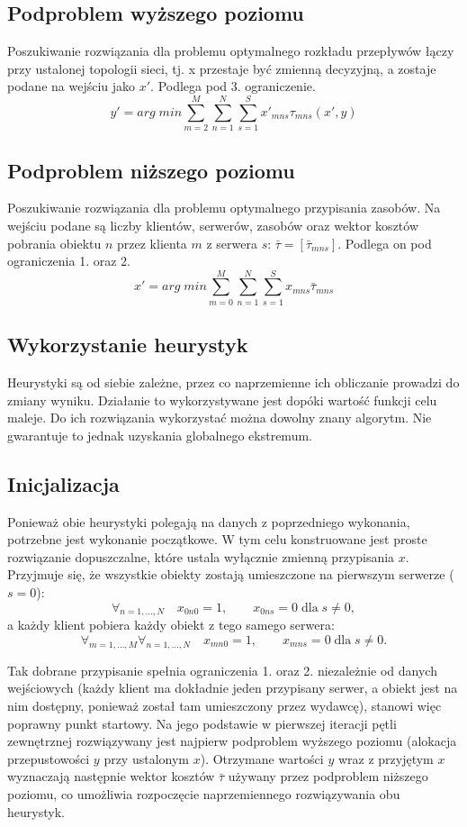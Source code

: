 \documentclass{article}
\begin{document}
\subsection{Podproblem wyższego poziomu}
Poszukiwanie rozwiązania dla problemu optymalnego rozkładu przepływów łączy przy ustalonej topologii sieci, tj. x przestaje być zmienną decyzyjną, a zostaje podane na wejściu jako $x'$. Podlega pod 3. ograniczenie.
\[y'=arg\;min\sum^M_{m=2}\sum^N_{n=1}\sum^S_{s=1}x'_{mns}\tau_{mns}(x',y)\]

\subsection{Podproblem niższego poziomu}
Poszukiwanie rozwiązania dla problemu optymalnego przypisania zasobów. Na wejściu podane są liczby klientów, serwerów, zasobów oraz wektor kosztów pobrania obiektu $n$ przez klienta $m$ z serwera $s$: $\bar{\tau}=[\bar{\tau}_{mns}]$. Podlega on pod ograniczenia 1. oraz 2.
\[x'=arg\;min\sum^M_{m=0}\sum^N_{n=1}\sum^S_{s=1}x_{mns}\bar{\tau}_{mns}\]

\subsection{Wykorzystanie heurystyk}
Heurystyki są od siebie zależne, przez co naprzemienne ich obliczanie prowadzi do zmiany wyniku. Działanie to wykorzystywane jest dopóki wartość funkcji celu maleje. Do ich rozwiązania wykorzystać można dowolny znany algorytm. Nie gwarantuje to jednak uzyskania globalnego ekstremum.

\subsection{Inicjalizacja}
Ponieważ obie heurystyki polegają na danych z poprzedniego wykonania, potrzebne jest wykonanie początkowe. W tym celu konstruowane jest proste rozwiązanie dopuszczalne, które ustala wyłącznie zmienną przypisania $x$. Przyjmuje się, że wszystkie obiekty zostają umieszczone na pierwszym serwerze ($s=0$):
\[\forall_{n=1,...,N}\quad x_{0n0}=1,\qquad x_{0ns}=0\;\text{dla}\;s\neq 0,\]
a każdy klient pobiera każdy obiekt z tego samego serwera:
\[\forall_{m=1,...,M}\forall_{n=1,...,N}\quad x_{mn0}=1,\qquad x_{mns}=0\;\text{dla}\;s\neq 0.\]

Tak dobrane przypisanie spełnia ograniczenia 1. oraz 2. niezależnie od danych wejściowych (każdy klient ma dokładnie jeden przypisany serwer, a obiekt jest na nim dostępny, ponieważ został tam umieszczony przez wydawcę), stanowi więc poprawny punkt startowy. Na jego podstawie w pierwszej iteracji pętli zewnętrznej rozwiązywany jest najpierw podproblem wyższego poziomu (alokacja przepustowości $y$ przy ustalonym $x$). Otrzymane wartości $y$ wraz z przyjętym $x$ wyznaczają następnie wektor kosztów $\bar{\tau}$ używany przez podproblem niższego poziomu, co umożliwia rozpoczęcie naprzemiennego rozwiązywania obu heurystyk.
\end{document}
